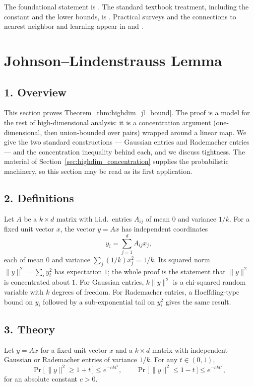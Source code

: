 The foundational statement is \cite{johnson1984}. The standard textbook
treatment, including the constant and the lower bounds, is
\cite{matousek2002}. Practical surveys and the connections to nearest
neighbor and learning appear in \cite{indyk1998} and \cite{harpeled2011}.

\section{Johnson--Lindenstrauss Lemma}
\label{sec:highdim_jl}

\subsection{1. Overview}

This section proves Theorem~\ref{thm:highdim_jl_bound}. The proof is a model
for the rest of high-dimensional analysis: it is a concentration argument
(one-dimensional, then union-bounded over pairs) wrapped around a linear map.
We give the two standard constructions --- Gaussian entries and Rademacher
entries --- and the concentration inequality behind each, and we discuss
tightness. The material of Section~\ref{sec:highdim_concentration} supplies
the probabilistic machinery, so this section may be read as its first
application.

\subsection{2. Definitions}

Let $A$ be a $k \times d$ matrix with i.i.d.\ entries $A_{ij}$ of mean $0$ and
variance $1/k$. For a fixed unit vector $x$, the vector $y = A x$ has
independent coordinates
\[
y_i = \sum_{j=1}^{d} A_{ij} x_j,
\]
each of mean $0$ and variance
$\sum_j (1/k) x_j^2 = 1/k$. Its squared norm
$\|y\|^2 = \sum_i y_i^2$ has expectation $1$; the whole proof is the statement
that $\|y\|^2$ is concentrated about $1$. For Gaussian entries, $k \|y\|^2$ is
a chi-squared random variable with $k$ degrees of freedom. For Rademacher
entries, a Hoeffding-type bound on $y_i$ followed by a sub-exponential tail on
$y_i^2$ gives the same result.

\subsection{3. Theory}

\begin{theorem}
\label{thm:highdim_jl_vector}
Let $y = A x$ for a fixed unit vector $x$ and a $k \times d$ matrix with
independent Gaussian or Rademacher entries of variance $1/k$. For any
$t \in (0, 1)$,
\[
\Pr\big[\,\|y\|^2 \ge 1 + t\,\big] \le e^{-c k t^2},
\qquad
\Pr\big[\,\|y\|^2 \le 1 - t\,\big] \le e^{-c k t^2},
\]
for an absolute constant $c > 0$.
\end{theorem}

